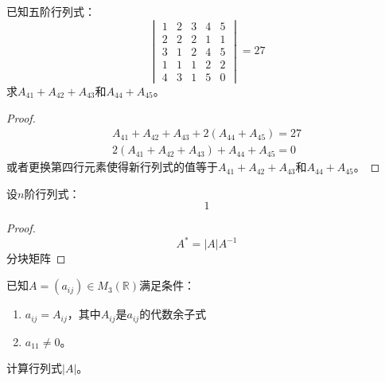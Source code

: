 \begin{theorem}
	已知五阶行列式：
	\begin{equation*}
		\begin{vmatrix}
			1 & 2 & 3 & 4 & 5 \\
			2 & 2 & 2 & 1 & 1 \\
			3 & 1 & 2 & 4 & 5 \\
 			1 & 1 & 1 & 2 & 2 \\
			4 & 3 & 1 & 5 & 0
		\end{vmatrix}
		=27
	\end{equation*}
	求$A_{41}+A_{42}+A_{43}$和$A_{44}+A_{45}$。
\end{theorem}
\begin{proof}
	\begin{align*}
		A_{41}+A_{42}+A_{43}+2(A_{44}+A_{45})=27 \\
		2(A_{41}+A_{42}+A_{43})+A_{44}+A_{45}=0
	\end{align*}
	或者更换第四行元素使得新行列式的值等于$A_{41}+A_{42}+A_{43}$和$A_{44}+A_{45}$。
\end{proof}

\begin{theorem}
	设$n$阶行列式：
	\begin{equation*}
		1
	\end{equation*}
\end{theorem}
\begin{proof}
	\begin{equation*}
		A^*=|A|A^{-1}
	\end{equation*}
	分块矩阵
\end{proof}

\begin{theorem}
	已知$A=(a_{ij})\in M_{3}(\mathbb{R})$满足条件：
	\begin{enumerate}
		\item $a_{ij}=A_{ij}$，其中$A_{ij}$是$a_{ij}$的代数余子式
		\item $a_{11}\ne0$。
	\end{enumerate}
	计算行列式$|A|$。
\end{theorem}

